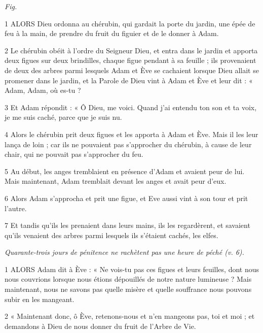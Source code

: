 
\par \textit{Fig.}

\par 1 ALORS Dieu ordonna au chérubin, qui gardait la porte du jardin, une épée de feu à la main, de prendre du fruit du figuier et de le donner à Adam.

\par 2 Le chérubin obéit à l'ordre du Seigneur Dieu, et entra dans le jardin et apporta deux figues sur deux brindilles, chaque figue pendant à sa feuille ; ils provenaient de deux des arbres parmi lesquels Adam et Ève se cachaient lorsque Dieu allait se promener dans le jardin, et la Parole de Dieu vint à Adam et Ève et leur dit : « Adam, Adam, où es-tu ?

\par 3 Et Adam répondit : « Ô Dieu, me voici. Quand j'ai entendu ton son et ta voix, je me suis caché, parce que je suis nu.

\par 4 Alors le chérubin prit deux figues et les apporta à Adam et Ève. Mais il les leur lança de loin ; car ils ne pouvaient pas s'approcher du chérubin, à cause de leur chair, qui ne pouvait pas s'approcher du feu.

\par 5 Au début, les anges tremblaient en présence d'Adam et avaient peur de lui. Mais maintenant, Adam tremblait devant les anges et avait peur d'eux.

\par 6 Alors Adam s'approcha et prit une figue, et Eve aussi vint à son tour et prit l'autre.

\par 7 Et tandis qu'ils les prenaient dans leurs mains, ils les regardèrent, et savaient qu'ils venaient des arbres parmi lesquels ils s'étaient cachés, les elfes.


\par \textit{Quarante-trois jours de pénitence ne rachètent pas une heure de péché (v. 6).}

\par 1 ALORS Adam dit à Ève : « Ne vois-tu pas ces figues et leurs feuilles, dont nous nous couvrions lorsque nous étions dépouillés de notre nature lumineuse ? Mais maintenant, nous ne savons pas quelle misère et quelle souffrance nous pouvons subir en les mangeant.

\par 2 « Maintenant donc, ô Ève, retenons-nous et n'en mangeons pas, toi et moi ; et demandons à Dieu de nous donner du fruit de l’Arbre de Vie.

